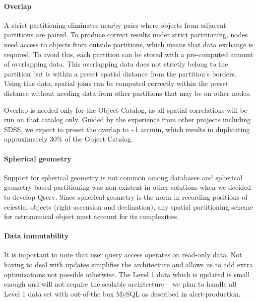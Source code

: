\documentclass[DM,lsstdraft,toc]{lsstdoc}
\begin{document}
\paragraph{Overlap}\label{overlap}

A strict partitioning eliminates nearby pairs where objects from
adjacent partitions are paired. To produce correct results under strict
partitioning, nodes need access to objects from outside partitions,
which means that data exchange is required. To avoid this, each
partition can be stored with a pre-computed amount of overlapping data.
This overlapping data does not strictly belong to the partition but is
within a preset spatial distance from the partition's borders. Using
this data, spatial joins can be computed correctly within the preset
distance without needing data from other partitions that may be on other
nodes.

Overlap is needed only for the Object Catalog, as all spatial
correlations will be run on that catalog only. Guided by the experience
from other projects including SDSS, we expect to preset the overlap to
\textasciitilde{}1 arcmin, which results in duplicating approximately
30\% of the Object Catalog.

\paragraph{Spherical geometry}\label{spherical-geometry}

Support for spherical geometry is not common among databases and
spherical geometry-based partitioning was non-existent in other
solutions when we decided to develop Qserv. Since spherical geometry is
the norm in recording positions of celestial objects (right-ascension
and declination), any spatial partitioning scheme for astronomical
object must account for its complexities.

\paragraph{Data immutability}\label{data-immutability}

It is important to note that user query access operates on read-only
data. Not having to deal with updates simplifies the architecture and
allows us to add extra optimizations not possible otherwise. The Level 1
data which is updated is small enough and will not require the scalable
architecture -- we plan to handle all Level 1 data set with out-of-the
box MySQL as described in alert-production.
\end{document}
